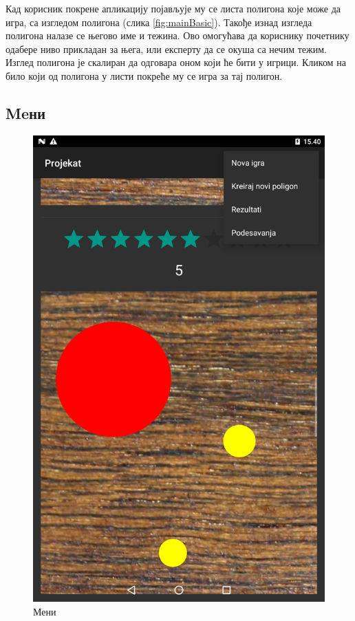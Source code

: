 Кад корисник покрене апликацију појављује му се листа полигона које може да игра, са изгледом полигона (слика \ref{fig:mainBasic}). Такође изнад изгледа полигона налазе се његово име и тежина. Ово омогућава да кориснику почетнику одабере ниво прикладан за њега, или експерту да се окуша са нечим тежим. Изглед полигона је скалиран да одговара оном који ће бити у игрици. Кликом на било који од полигона у листи покреће му се игра за тај полигон.

\subsection{Meни} 
\begin{figure}[htb!]
\begin{center}
\includegraphics[scale=.1]{pictures/main/Menu}
\caption{Мени}\label{fig:mainMenu}
\end{center}
\end{figure}
